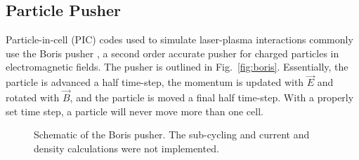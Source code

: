 \documentclass[]{article}
\begin{document}
\subsection{Particle Pusher}
Particle-in-cell (PIC) codes used to simulate laser-plasma interactions commonly use the Boris pusher \cite{bird}, a second order accurate pusher for charged particles in electromagnetic fields.  The pusher is outlined in Fig.~\ref{fig:boris}.  Essentially, the particle is advanced a half time-step, the momentum is updated with $\vec{E}$ and rotated with $\vec{B}$, and the particle is moved a final half time-step.  With a properly set time step, a particle will never move more than one cell.


\begin{figure}[htbp]
\centering
\caption{Schematic of the Boris pusher.  The sub-cycling and current and density calculations were not implemented.}
\end{figure}
\end{document}
